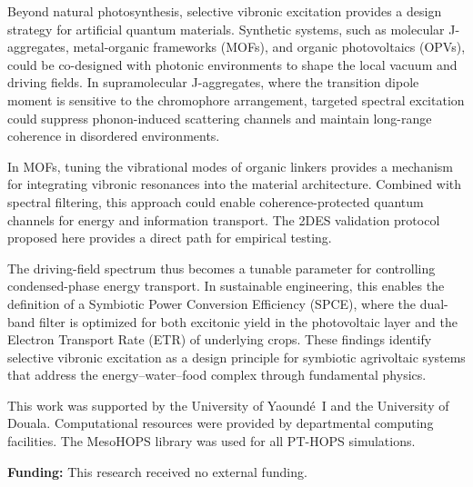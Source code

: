\documentclass[journal=jpcl,manuscript=letter]{achemso}
\begin{document}
Beyond natural photosynthesis, selective vibronic excitation provides a design strategy for artificial quantum materials. Synthetic systems, such as molecular J-aggregates, metal-organic frameworks (MOFs), and organic photovoltaics (OPVs), could be co-designed with photonic environments to shape the local vacuum and driving fields. In supramolecular J-aggregates, where the transition dipole moment is sensitive to the chromophore arrangement, targeted spectral excitation could suppress phonon-induced scattering channels and maintain long-range coherence in disordered environments.

In MOFs, tuning the vibrational modes of organic linkers provides a mechanism for integrating vibronic resonances into the material architecture. Combined with spectral filtering, this approach could enable coherence-protected quantum channels for energy and information transport. The 2DES validation protocol proposed here provides a direct path for empirical testing.

The driving-field spectrum thus becomes a tunable parameter for controlling condensed-phase energy transport. In sustainable engineering, this enables the definition of a Symbiotic Power Conversion Efficiency (SPCE), where the dual-band filter is optimized for both excitonic yield in the photovoltaic layer and the Electron Transport Rate (ETR) of underlying crops. These findings identify selective vibronic excitation as a design principle for symbiotic agrivoltaic systems that address the energy--water--food complex through fundamental physics.


\begin{acknowledgement}
This work was supported by the University of Yaoundé~I and the University of Douala. Computational resources were provided by departmental computing facilities. The MesoHOPS library was used for all PT-HOPS simulations.
\end{acknowledgement}

\vspace{1ex}
\noindent\textbf{Funding:} This research received no external funding.

\end{document}
